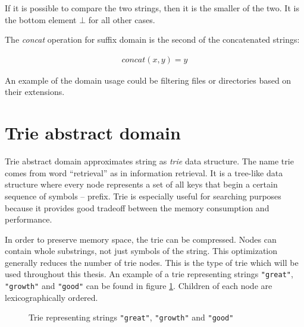 \documentclass[12pt,final,oneside]{fithesis2}
\theoremstyle{definition}
\begin{document}
If it is possible to compare the two strings, then it is the smaller of the
two. It is the bottom element $\bot$ for all other cases.

The \textit{concat} operation for suffix domain is the second of the
concatenated strings:

\begin{align*}
\textit{concat}(x, y) = y
\end{align*}

An example of the domain usage could be filtering files or directories
based on their extensions.


\section{Trie abstract domain}

Trie abstract domain approximates string as \textit{trie} data structure.
The name trie comes from word ``retrieval'' as in information retrieval. It
is a tree-like data structure where every node represents a set of all keys
that begin a certain sequence of symbols -- prefix. Trie is especially useful
for searching purposes because it provides good tradeoff between the memory
consumption and performance.

In order to preserve memory space, the trie can be compressed. Nodes can
contain whole substrings, not just symbols of the string. This optimization
generally reduces the number of trie nodes. This is the type of
trie which will be used throughout this thesis. An example of a trie
representing strings \texttt{"great"}, \texttt{"growth"} and \texttt{"good"}
can be found in figure \ref{fig:trie}. Children of each node are
lexicographically ordered.

\begin{figure}[ht]
\centering
{}
\caption{Trie representing strings \texttt{"great"}, \texttt{"growth"} and
  \texttt{"good"}}
\label{fig:trie}
\end{figure}
\end{document}
